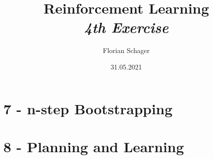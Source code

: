 \documentclass{article}
\title
{
  Reinforcement Learning \\
  \vspace{4pt}
  \normalsize
  \textit{4th Exercise}
}
\author
{
  Florian Schager
}
\date{31.05.2021}
\begin{document}
\maketitle

\section*{7 - n-step Bootstrapping}




\section*{8 - Planning and Learning}



\end{document}
